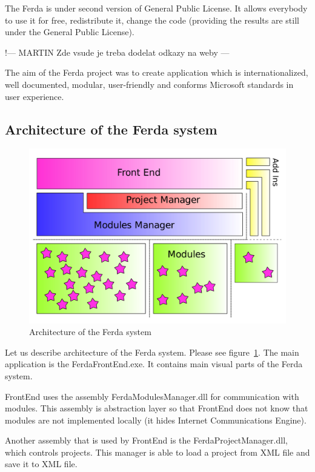 \documentclass[a4paper,12pt]{book}
\begin{document}
The Ferda is under second version of General Public License. It allows everybody to use it for free, redistribute it, change the code (providing the results are still under the General Public License).

!--- MARTIN Zde vsude je treba dodelat odkazy na weby ---

The aim of the Ferda project was to create application which is internationalized, well documented, modular, user-friendly and conforms Microsoft standards in user experience.

\subsection{Architecture of the Ferda system}
\begin{figure}
	\noindent\includegraphics[width=1\textwidth]{designB}
	\caption{Architecture of the Ferda system}
	\label{fig:architectureFerda}
\end{figure}

Let us describe architecture of the Ferda system. Please see figure~\ref{fig:architectureFerda}. The main application is the FerdaFrontEnd.exe. It contains main visual parts of the Ferda system.

FrontEnd uses the assembly FerdaModulesManager.dll for communication with modules. This assembly is abstraction layer so that FrontEnd does not know that modules are not implemented locally (it hides Internet Communications Engine).

Another assembly that is used by FrontEnd is the FerdaProjectManager.dll, which controls projects.  This manager is able to load a project from XML file and save it to XML file.
\end{document}
